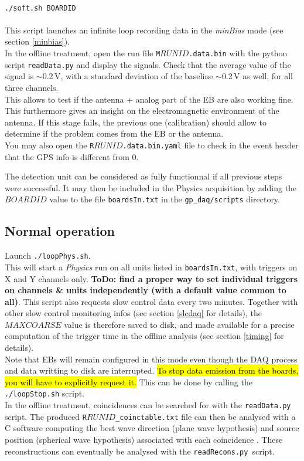 \begin{enumerate}[1-]
{\ \\
\texttt{./soft.sh BOARDID} \\
\ \\
This script launches an infinite loop recording data in the {\it minBias} mode (see section \ref{minbias}). \\
In the offline treatment, open the run file \texttt{M$RUNID$.data.bin} with the python script \texttt{readData.py} and display the signals. Check that the average value of the signal is $\sim$0.2\,V, with a standard deviation of the baseline $\sim$0.2\,V as well, for all three channels. \\
This allows to test if the antenna + analog part of the EB are also working fine. This furthermore gives an insight on the electromagnetic environment of the antenna. If this stage fails, the previous one (calibration) should allow to determine if the problem comes from the EB or the antenna. \\
You may also open the \texttt{R$RUNID$.data.bin.yaml} file to check in the event header that the GPS info is different from 0. \\}
\end{enumerate}
%
The detection unit can be considered as fully functionnal if all previous steps were successful. It may then be included in the Physics acquisition by adding the $BOARDID$ value to the file \texttt{boardsIn.txt} in the \texttt{gp\_daq/scripts} directory. 

\subsection{Normal operation}
Launch \texttt{./loopPhys.sh}. \\
This will start a {\it Physics} run on all units listed in \texttt{boardsIn.txt}, with triggers on X and Y channels only. {\bf ToDo: find a proper way to set individual triggers on channels \& units independently (with a default value common to all)}. This script also requests slow control data every two minutes. Together with other slow control monitoring infos (see section \ref{slcdaq} for details), the $MAXCOARSE$ value is therefore saved to disk, and made available for a precise computation of the trigger time  in the offline analysis (see section \ref{timing} for details). \\
%
Note that EBs will remain configured in this mode even though the DAQ process and data writting to disk are interrupted. \hl{To stop data emission from the boards, you will have to explicitly request it.} This can be done by calling the \texttt{./loopStop.sh} script. \\
%
In the offline treatment, coincidences can be searched for with the \texttt{readData.py} script. The produced \texttt{R$RUNID$\_coinctable.txt} file can then be analysed with a C software computing the best wave direction (plane wave hypothesis) and source position (spherical wave hypothesis) associated with each coincidence \cite{recons_git}. These reconstructions can eventually be analysed with the \texttt{readRecons.py}\,\cite{ana_git} script.


